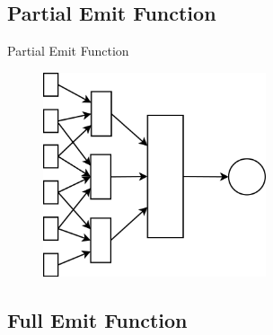 \documentclass{beamer}
\begin{document}
\subsection*{Partial Emit Function}

\begin{frame}{Partial Emit Function}
\begin{figure}[H]
	\begin{center}
  		\includegraphics[height=6cm]{PresentationPartial.png}
	\end{center}
\end{figure}
\end{frame}

\subsection*{Full Emit Function}
\end{document}
